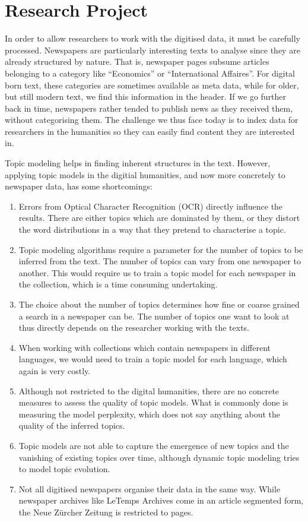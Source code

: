 \section{Research Project}

In order to allow researchers to work with the digitised data, it must be carefully processed. Newspapers are particularly interesting texts to analyse since they are already structured by nature. That is, newspaper pages subsume articles belonging to a category like ``Economics'' or ``International Affaires''. For digital born text, these categories are sometimes available as meta data, while for older, but still modern text, we find this information in the header. If we go further back in time, newspapers rather tended to publish news as they received them, without categorising them. The challenge we thus face today is to index data for researchers in the humanities so they can easily find content they are interested in.

Topic modeling helps in finding inherent structures in the text. However, applying topic models in the digitial humanities, and now more concretely to newspaper data, has some shortcomings: 

\begin{enumerate}
    \item Errors from Optical Character Recognition (OCR) directly influence the results. There are either topics which are dominated by them, or they distort the word distributions in a way that they pretend to characterise a topic.
    \item Topic modeling algorithms require a parameter for the number of topics to be inferred from the text. The number of topics can vary from one newspaper to another. This would require us to train a topic model for each newspaper in the collection, which is a time consuming undertaking.
    \item The choice about the number of topics determines how fine or coarse grained a search in a newspaper can be. The number of topics one want to look at thus directly depends on the researcher working with the texts. 
    \item When working with collections which contain newspapers in different languages, we would need to train a topic model for each language, which again is very costly.
    \item Although not restricted to the digital humanities, there are no concrete measures to assess the quality of topic models. What is commonly done is measuring the model perplexity, which does not say anything about the quality of the inferred topics.
    \item Topic models are not able to capture the emergence of new topics and the vanishing of existing topics over time, although dynamic topic modeling tries to model topic evolution.
    \item Not all digitised newspapers organise their data in the same way. While newspaper archives like LeTemps Archives come in an article segmented form, the Neue Zürcher Zeitung is restricted to pages.
\end{enumerate}

